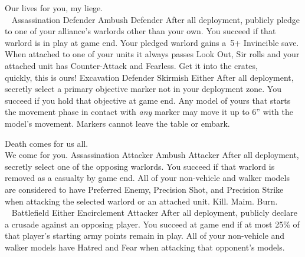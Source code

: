 \clearpage
\squelchbackground

\noindent%
%
{Our lives for you, my liege.\\~}%
{Assassination}%
{Defender}%
{Ambush}%
{Defender}%
{After all deployment, publicly pledge to one of your alliance's
  warlords other than your own.  You succeed if that warlord is in
  play at game end.}%
{Your pledged warlord gains a~5+ Invincible save.  When attached to
  one of your units it always passes Look Out, Sir rolls and your
  attached unit has Counter-Attack and Fearless.}
\hfill
%
{Get it into the crates,\\quickly, this is ours!}  {Excavation}%
{Defender}%
{Skirmish}%
{Either}%
{After all deployment, secretly select a primary objective marker not
  in your deployment zone.  You succeed if you hold that objective at
  game end.}%
{Any model of yours that starts the movement phase in contact with
  \emph{any} marker may move it up to 6'' with the model's movement.
  Markers cannot leave the table or embark.}


\vfill

\noindent%
%
{Death comes for us all.\\We come for you.}%
{Assassination}%
{Attacker}%
{Ambush}%
{Attacker}%
{After all deployment, secretly select one of the opposing warlords.
  You succeed if that warlord is removed as a casualty by game end.}%
{All of your non-vehicle and walker models are considered to have
  Preferred Enemy, Precision Shot, and Precision Strike when attacking
  the selected warlord or an attached unit.}
\hfill
%
{Kill.  Maim.  Burn.\\~}%
{Battlefield}%
{Either}%
{Encirclement}%
{Attacker}%
{After all deployment, publicly declare a crusade against an opposing
  player.  You succeed at game end if at most 25\% of that player's
  starting army points remain in play.}%
{All of your non-vehicle and walker models have Hatred and Fear when
  attacking that opponent's models.}


\pagebreak

